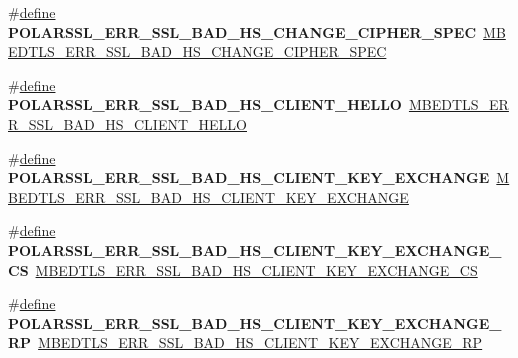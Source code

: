 \begin{DoxyCompactItemize}
\#\hyperlink{structdefine}{define} {\bfseries P\+O\+L\+A\+R\+S\+S\+L\+\_\+\+E\+R\+R\+\_\+\+S\+S\+L\+\_\+\+B\+A\+D\+\_\+\+H\+S\+\_\+\+C\+H\+A\+N\+G\+E\+\_\+\+C\+I\+P\+H\+E\+R\+\_\+\+S\+P\+EC}~\hyperlink{ssl_8h_ad314b558c98da450853468f71895d615}{M\+B\+E\+D\+T\+L\+S\+\_\+\+E\+R\+R\+\_\+\+S\+S\+L\+\_\+\+B\+A\+D\+\_\+\+H\+S\+\_\+\+C\+H\+A\+N\+G\+E\+\_\+\+C\+I\+P\+H\+E\+R\+\_\+\+S\+P\+EC}
\item 
\mbox{\label{compat-1_83_8h_a981518b3ec1d68d785028766ccd735ae}} 
\#\hyperlink{structdefine}{define} {\bfseries P\+O\+L\+A\+R\+S\+S\+L\+\_\+\+E\+R\+R\+\_\+\+S\+S\+L\+\_\+\+B\+A\+D\+\_\+\+H\+S\+\_\+\+C\+L\+I\+E\+N\+T\+\_\+\+H\+E\+L\+LO}~\hyperlink{ssl_8h_ac89dc637982bd86c71757c4ec86ddcc0}{M\+B\+E\+D\+T\+L\+S\+\_\+\+E\+R\+R\+\_\+\+S\+S\+L\+\_\+\+B\+A\+D\+\_\+\+H\+S\+\_\+\+C\+L\+I\+E\+N\+T\+\_\+\+H\+E\+L\+LO}
\item 
\mbox{\label{compat-1_83_8h_a446cd19a186cc2a67f64993af3013fbd}} 
\#\hyperlink{structdefine}{define} {\bfseries P\+O\+L\+A\+R\+S\+S\+L\+\_\+\+E\+R\+R\+\_\+\+S\+S\+L\+\_\+\+B\+A\+D\+\_\+\+H\+S\+\_\+\+C\+L\+I\+E\+N\+T\+\_\+\+K\+E\+Y\+\_\+\+E\+X\+C\+H\+A\+N\+GE}~\hyperlink{ssl_8h_a8de57eeca7485d08d11f5f384a7bf17c}{M\+B\+E\+D\+T\+L\+S\+\_\+\+E\+R\+R\+\_\+\+S\+S\+L\+\_\+\+B\+A\+D\+\_\+\+H\+S\+\_\+\+C\+L\+I\+E\+N\+T\+\_\+\+K\+E\+Y\+\_\+\+E\+X\+C\+H\+A\+N\+GE}
\item 
\mbox{\label{compat-1_83_8h_aa6cfcd4ac760424f436ce5d023e082c6}} 
\#\hyperlink{structdefine}{define} {\bfseries P\+O\+L\+A\+R\+S\+S\+L\+\_\+\+E\+R\+R\+\_\+\+S\+S\+L\+\_\+\+B\+A\+D\+\_\+\+H\+S\+\_\+\+C\+L\+I\+E\+N\+T\+\_\+\+K\+E\+Y\+\_\+\+E\+X\+C\+H\+A\+N\+G\+E\+\_\+\+CS}~\hyperlink{ssl_8h_af5c8a932814077d04bc22ed51fbddf6a}{M\+B\+E\+D\+T\+L\+S\+\_\+\+E\+R\+R\+\_\+\+S\+S\+L\+\_\+\+B\+A\+D\+\_\+\+H\+S\+\_\+\+C\+L\+I\+E\+N\+T\+\_\+\+K\+E\+Y\+\_\+\+E\+X\+C\+H\+A\+N\+G\+E\+\_\+\+CS}
\item 
\mbox{\label{compat-1_83_8h_a2726e209ffa43b6c2ce45e22fad0a870}} 
\#\hyperlink{structdefine}{define} {\bfseries P\+O\+L\+A\+R\+S\+S\+L\+\_\+\+E\+R\+R\+\_\+\+S\+S\+L\+\_\+\+B\+A\+D\+\_\+\+H\+S\+\_\+\+C\+L\+I\+E\+N\+T\+\_\+\+K\+E\+Y\+\_\+\+E\+X\+C\+H\+A\+N\+G\+E\+\_\+\+RP}~\hyperlink{ssl_8h_a0038d1d08de609a963b595f423d13841}{M\+B\+E\+D\+T\+L\+S\+\_\+\+E\+R\+R\+\_\+\+S\+S\+L\+\_\+\+B\+A\+D\+\_\+\+H\+S\+\_\+\+C\+L\+I\+E\+N\+T\+\_\+\+K\+E\+Y\+\_\+\+E\+X\+C\+H\+A\+N\+G\+E\+\_\+\+RP}

\end{DoxyCompactItemize}
